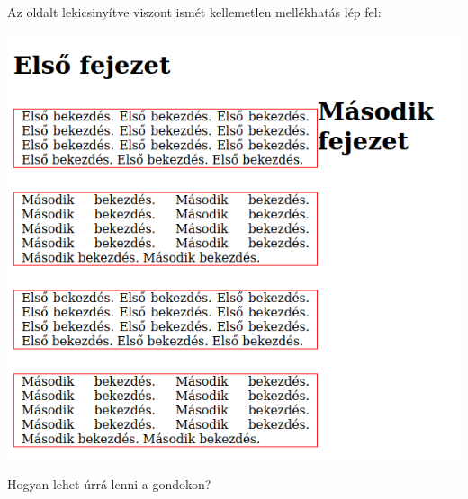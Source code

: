 \begin{frame}
  \begin{columns}[c]
      \begin{exampleblock}{}
        \scriptsize
        
      \end{exampleblock}
      \begin{exampleblock}{}
        \scriptsize
        
      \end{exampleblock}
  \end{columns}
\end{frame}

\begin{frame}
  Az oldalt lekicsinyítve viszont ismét kellemetlen mellékhatás lép fel:
  \vfill
  \begin{center}
    \includegraphics[width=.3\textwidth]{lebeg22.png}\\
  \end{center}
  Hogyan lehet úrrá lenni a gondokon?
\end{frame}

